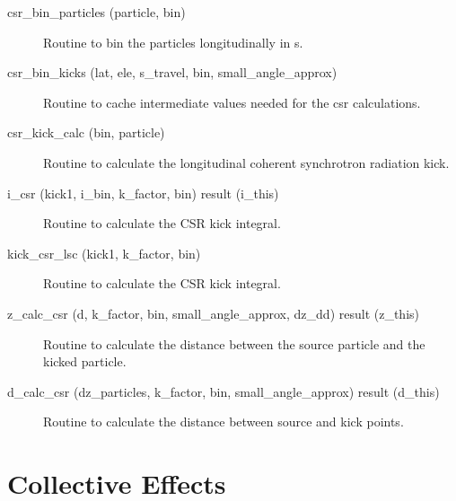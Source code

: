 \begin{description}

\label{r:csr.bin.particles}
\item[csr_bin_particles (particle, bin)] \Newline 
Routine to bin the particles longitudinally in s. 

\label{r:csr.bin.kicks}
\item[csr_bin_kicks (lat, ele, s_travel, bin, small_angle_approx)] \Newline 
Routine to cache intermediate values needed for the csr calculations.

\label{r:csr.kick.calc}
\item[csr_kick_calc (bin, particle)] \Newline 
Routine to calculate the longitudinal coherent synchrotron radiation kick.

\label{r:i.csr}
\item[i_csr (kick1, i_bin, k_factor, bin) result (i_this)] \Newline 
Routine to calculate the CSR kick integral.

\label{r:kick.csr.lsc}
\item[kick_csr_lsc (kick1, k_factor, bin)] \Newline 
Routine to calculate the CSR kick integral.

\label{r:z.calc.csr}
\item[z_calc_csr (d, k_factor, bin, small_angle_approx, dz_dd) result (z_this)] \Newline 
Routine to calculate the distance between the source particle and the
kicked particle.

\label{r:d.calc.csr}
\item[d_calc_csr (dz_particles, k_factor, bin, small_angle_approx) result (d_this)] \Newline 
Routine to calculate the distance between source and kick points.

\end{description}

\section{Collective Effects}
\label{r:collective}

